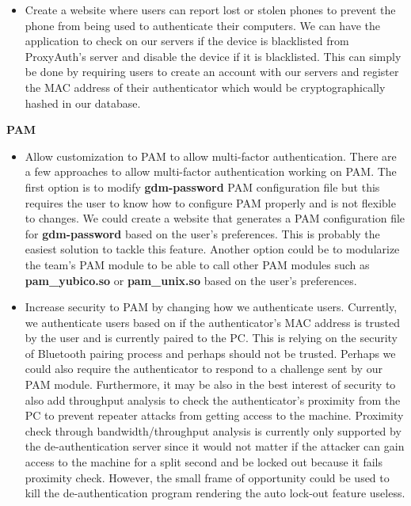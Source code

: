 \documentclass[letterpaper,twocolumn,10pt]{article}
\begin{document}
{{\begin{itemize}
\item Create a website where users can report lost or stolen phones to prevent the phone from being used to authenticate their computers. We can have the application to check on our servers if the device is blacklisted from ProxyAuth's server and disable the device if it is blacklisted. This can simply be done by requiring users to create an account with our servers and register the MAC address of their authenticator which would be cryptographically hashed in our database.
\end{itemize}

\hrulefill

\textbf{PAM}
\begin{itemize}
\item Allow customization to PAM to allow multi-factor authentication. There are a few approaches to allow multi-factor authentication working on PAM. The first option is to modify \textbf{gdm-password} PAM configuration file but this requires the user to know how to configure PAM properly and is not flexible to changes. We could create a website that generates a PAM configuration file for \textbf{gdm-password} based on the user's preferences. This is probably the easiest solution to tackle this feature. Another option could be to modularize the team's PAM module to be able to call other PAM modules such as \textbf{pam\_yubico.so} or \textbf{pam\_unix.so} based on the user's preferences.
\item Increase security to PAM by changing how we authenticate users. Currently, we authenticate users based on if the authenticator's MAC address is trusted by the user and is currently paired to the PC. This is relying on the security of Bluetooth pairing process and perhaps should not be trusted. Perhaps we could also require the authenticator to respond to a challenge sent by our PAM module. Furthermore, it may be also in the best interest of security to also add throughput analysis to check the authenticator's proximity from the PC to prevent repeater attacks from getting access to the machine. Proximity check through bandwidth/throughput analysis is currently only supported by the de-authentication server since it would not matter if the attacker can gain access to the machine for a split second and be locked out because it fails proximity check. However, the small frame of opportunity could be used to kill the de-authentication program rendering the auto lock-out feature useless.
\end{itemize}

}}
\end{document}
